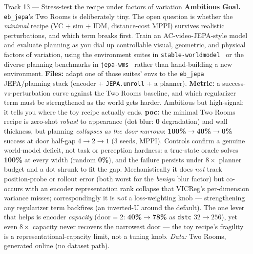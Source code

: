 \documentclass{article}
\newcommand{\code}[1]{\texttt{\small #1}}
\newcommand{\diffhard}{\colorbox{ebred!15}{\textcolor{ebred}{\small\bfseries Ambitious}}}
\begin{document}
\begin{trackbox}{Track 13 --- Stress-test the recipe under factors of variation \hfill \diffhard{}}
\textbf{Goal.} \texttt{eb\_jepa}'s Two Rooms is deliberately tiny. The open question
is whether the \emph{minimal} recipe (VC + sim + IDM, distance-cost MPPI) survives
realistic perturbations, and which term breaks first. Train an AC-video-JEPA-style
model and evaluate planning as you dial up controllable visual, geometric, and
physical factors of variation, using the environment suites in
\texttt{stable-worldmodel}~\citep{stableworldmodel} or the diverse planning
benchmarks in \texttt{jepa-wms}~\citep{terver2026JEPAWMs} rather than hand-building a
new environment. \textbf{Files:} adapt one of those suites' envs to the
\code{eb\_jepa} JEPA/planning stack (encoder + \code{JEPA.unroll} + a planner).
\textbf{Metric:} a success-vs-perturbation curve against the Two Rooms baseline, and
which regularizer term must be strengthened as the world gets harder. Ambitious but
high-signal: it tells you where the toy recipe actually ends.
\smallskip
\textbf{poc:} the minimal Two Rooms recipe is zero-shot \emph{robust} to appearance
(dot blur: \textbf{0} degradation) and wall thickness, but planning \emph{collapses as the
door narrows}: \textbf{100\%$\to$40\%$\to$0\%} success at door half-gap $4\to2\to1$ (3 seeds,
MPPI). Controls confirm a genuine world-model deficit, not task or perception hardness: a
true-state oracle solves \textbf{100\%} at every width (random \textbf{0\%}), and the failure
persists under $8\times$ planner budget and a dot shrunk to fit the gap. Mechanistically it
does \emph{not} track position-probe or rollout error (both worst for the \emph{benign} blur
factor) but co-occurs with an encoder representation rank collapse that VICReg's
per-dimension variance misses; correspondingly it is \emph{not} a loss-weighting knob ---
strengthening any regularizer term backfires (an inverted-U around the default). The one
lever that helps is encoder \emph{capacity} (door$=$2: \textbf{40\%$\to$78\%} as \code{dstc}
$32\to256$), yet even $8\times$ capacity never recovers the narrowest door --- the toy
recipe's fragility is a representational-capacity limit, not a tuning knob.
\emph{Data:} Two Rooms, generated online (no dataset path).
\end{trackbox}
\end{document}
